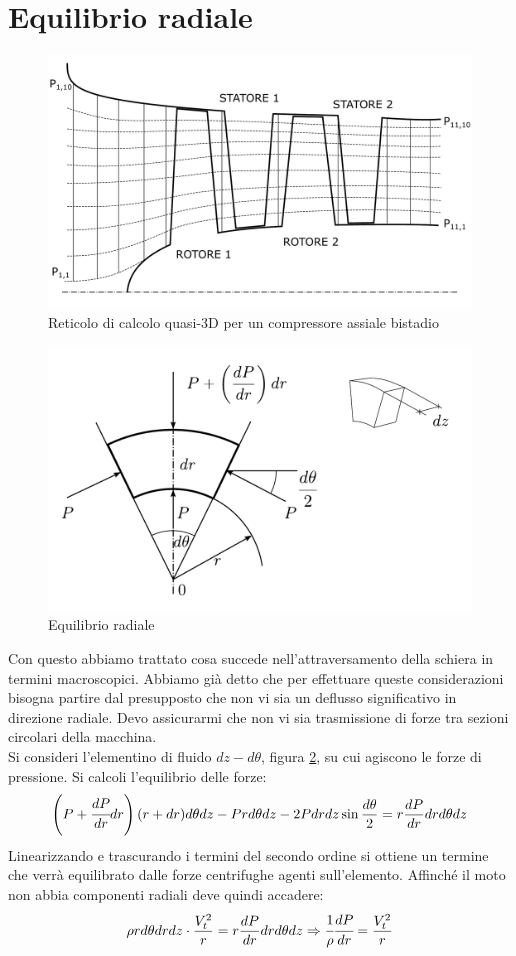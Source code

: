 \section{Equilibrio radiale}
\begin{figure}
\centering
  \includegraphics[width=.8\textwidth]{fig/ReticoloComp.pdf}
\caption{Reticolo di calcolo quasi-3D per un compressore assiale bistadio}
\label{fig:ReticoloComp}
\end{figure}
\begin{figure}
\centering
  \includegraphics[width=.6\textwidth]{fig/concio.pdf}
\caption{Equilibrio radiale}
\label{fig:concio}
\end{figure}
Con questo abbiamo trattato cosa succede nell'attraversamento della schiera in termini macroscopici. Abbiamo già detto che per effettuare queste considerazioni bisogna partire dal presupposto che non vi sia un deflusso significativo in direzione radiale. Devo assicurarmi che non vi sia trasmissione di forze tra sezioni circolari della macchina.\\
Si consideri l'elementino di fluido $dz - d\theta$, figura \ref{fig:concio}, su cui agiscono le forze di pressione. Si calcoli l'equilibrio delle forze:
\begin{align*}
\left( P + \cfrac{dP}{dr} dr \right) (r + dr) d \theta dz - Pr d \theta dz -2P dr dz \sin \frac{d \theta}{2} = r \frac{dP}{dr} dr d \theta dz
\end{align*}
Linearizzando e trascurando i termini del secondo ordine si ottiene un termine che verrà equilibrato dalle forze centrifughe agenti sull'elemento. Affinché il moto non abbia componenti radiali deve quindi accadere:
\begin{equation}
\rho r d \theta dr dz \cdot \frac{V_t^2}{r} = r \frac{dP}{dr} dr d \theta dz\Rightarrow \cfrac{1}{\rho} \cfrac{dP}{dr} = \frac{V_t^2}{r}
\label{eq:EquilibrioRad}
\end{equation}
